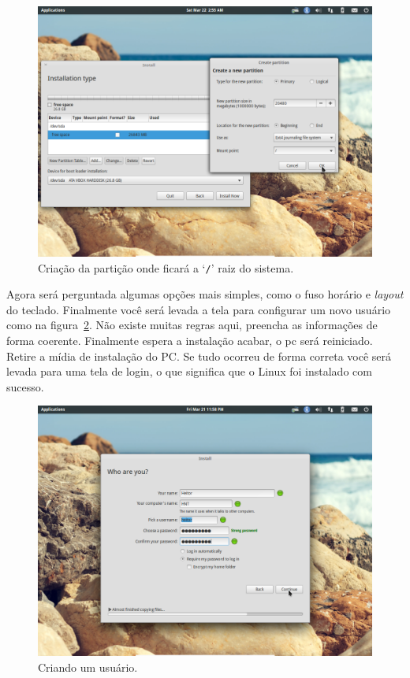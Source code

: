 \documentclass{handout_utfpr}
\begin{document}
\begin{figure}[h]
  \centering
  \includegraphics[scale=.3]{imagens/elementary-install-05.png}
  \caption{Criação da partição onde ficará a `\texttt{/}' raiz do sistema.}
  \label{fig:elementary-root}
\end{figure}

Agora será perguntada algumas opções mais simples, como o fuso horário e \textit{layout} do teclado. Finalmente você será levada a tela para configurar um novo usuário como na figura~\ref{fig:elementary-info}. Não existe muitas regras aqui, preencha as informações de forma coerente. Finalmente espera a instalação acabar, o pc será reiniciado. Retire a mídia de instalação do PC\@. Se tudo ocorreu de forma correta você será levada para uma tela de login, o que significa que o Linux foi instalado com sucesso.

\begin{figure}[h]
  \centering
  \includegraphics[scale=.3]{imagens/elementary-install-10.png}
  \caption{Criando um usuário.}
  \label{fig:elementary-info}
\end{figure}
\end{document}
